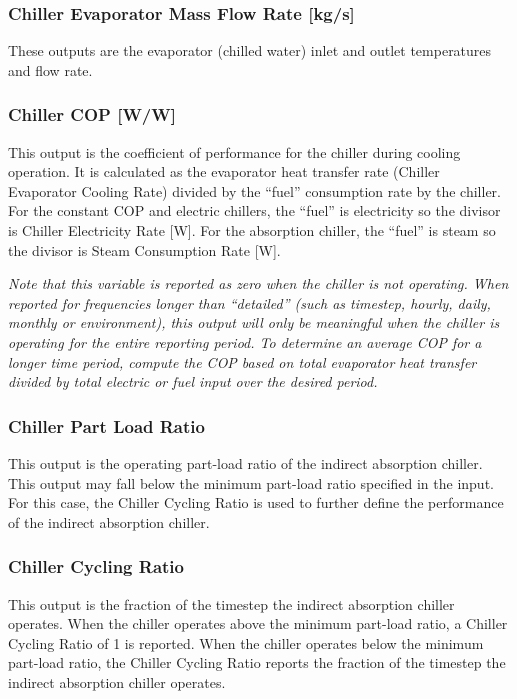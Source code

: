 \subsubsection{Chiller Evaporator Mass Flow Rate {[}kg/s{]}}\label{chiller-evaporator-mass-flow-rate-kgs}

These outputs are the evaporator (chilled water) inlet and outlet temperatures and flow rate.

\subsubsection{Chiller COP {[}W/W{]}}\label{chiller-cop-ww}

This output is the coefficient of performance for the chiller during cooling operation. It is calculated as the evaporator heat transfer rate (Chiller Evaporator Cooling Rate) divided by the ``fuel'' consumption rate by the chiller. For the constant COP and electric chillers, the ``fuel'' is electricity so the divisor is Chiller Electricity Rate {[}W{]}. For the absorption chiller, the ``fuel'' is steam so the divisor is Steam Consumption Rate {[}W{]}.

\emph{Note that this variable is reported as zero when the chiller is not operating. When reported for frequencies longer than ``detailed'' (such as timestep, hourly, daily, monthly or environment), this output will only be meaningful when the chiller is operating for the entire reporting period. To determine an average COP for a longer time period, compute the COP based on total evaporator heat transfer divided by total electric or fuel input over the desired period.}

\subsubsection{Chiller Part Load Ratio}\label{chiller-part-load-ratio}

This output is the operating part-load ratio of the indirect absorption chiller. This output may fall below the minimum part-load ratio specified in the input. For this case, the Chiller Cycling Ratio is used to further define the performance of the indirect absorption chiller.

\subsubsection{Chiller Cycling Ratio}\label{chiller-cycling-ratio}

This output is the fraction of the timestep the indirect absorption chiller operates. When the chiller operates above the minimum part-load ratio, a Chiller Cycling Ratio of 1 is reported. When the chiller operates below the minimum part-load ratio, the Chiller Cycling Ratio reports the fraction of the timestep the indirect absorption chiller operates.

